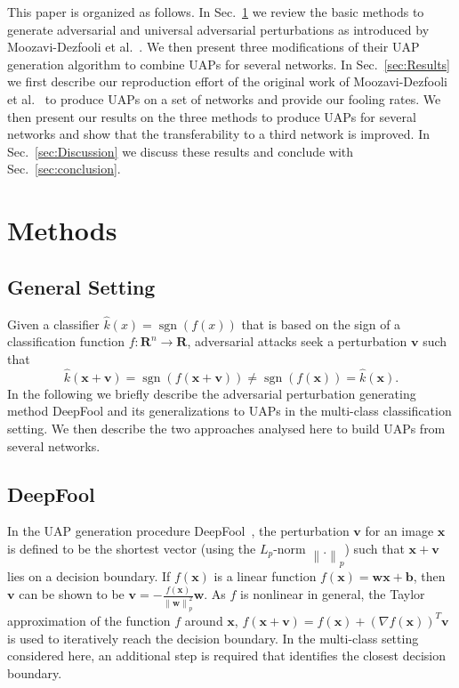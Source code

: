\documentclass[runningheads]{llncs}
\DeclareMathOperator{\sgn}{sgn}
\newcommand{\xb}{\ensuremath{\mathbf{x}}}
\newcommand{\vb}{\ensuremath{\mathbf{v}}}
\begin{document}
This paper is organized as follows. In Sec.~\ref{sec:methods} we review the basic methods to generate adversarial and universal adversarial perturbations as introduced by Moozavi-Dezfooli et al.~\cite{moosavidezfooli_universal_2017}. We then present three modifications of their UAP generation algorithm to combine UAPs for several networks. In Sec.~\ref{sec:Results} we first describe our reproduction effort of the original work of Moozavi-Dezfooli et al.~\cite{moosavidezfooli_universal_2017} to produce UAPs on a set of networks and provide our fooling rates. We then present our results on the three methods to produce UAPs for several networks and show that the transferability to a third network is improved. In Sec.~\ref{sec:Discussion} we discuss these results and conclude with Sec.~\ref{sec:conclusion}.

\section{Methods}\label{sec:methods}
\subsection{General Setting}
Given a classifier \(\hat{k}(x)=\sgn\left(f(x)\right)\) that is based on the sign of a classification function \(f:\mathbf{R}^n\rightarrow\mathbf{R}\), adversarial attacks seek a perturbation \(\vb\) such that \[\hat{k}(\xb+\vb)=\sgn\left(f(\xb+\vb)\right)\neq \sgn\left(f(\xb)\right)=\hat{k}(\xb).\] 
In the following we briefly describe the adversarial perturbation generating method DeepFool and its generalizations to UAPs in the multi-class classification setting. We then describe the two approaches analysed here to build UAPs from several networks. 

\subsection{DeepFool}
%
In the UAP generation procedure DeepFool~\cite{moosavi-dezfooli_deepfool_2016}, the perturbation \(\mathbf{v}\) for an image \(\xb\) is defined to be the shortest vector (using the \(L_p\)-norm \(\left\|.\right\|_p\)) such that \(\xb+\mathbf{v}\) lies on a decision boundary. 
If $f(\xb)$ is a linear function $f(\xb)=\mathbf{w} \xb+\mathbf{b}$, then \(\mathbf{v}\) can be shown to be \(\mathbf{v}=-\frac{f(\xb)}{\left\|\mathbf{w}\right\|_p^2}\mathbf{w}\). As \(f\) is nonlinear in general, the Taylor approximation of the function $f$ around \(\mathbf{x}\), \(f(\mathbf{x}+\mathbf{v})=f(\mathbf{x})+\left(\nabla f(\mathbf{x})\right)^T\mathbf{v}\) is used to iteratively reach the decision boundary. 
In the multi-class setting considered here, an additional step is required that identifies the closest decision boundary. 
\end{document}
